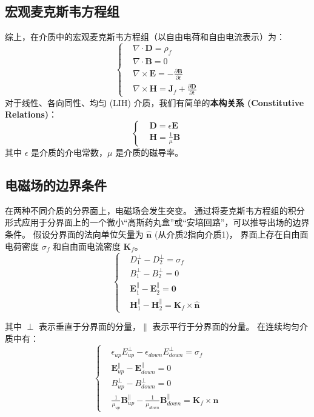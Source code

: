 \documentclass[fontset=none]{ctexart}
\begin{document}
\subsection{宏观麦克斯韦方程组}
综上，在介质中的宏观麦克斯韦方程组（以自由电荷和自由电流表示）为：
\begin{equation}
    \left\{
    \begin{aligned}
    &\nabla \cdot \bm{D} = \rho_f \\
    &\nabla \cdot \bm{B} = 0 \\
    &\nabla \times \bm{E} = -\frac{\partial\bm{B}}{\partial t}\\
    &\nabla \times \bm{H} = \bm{J}_f + \frac{\partial \bm{D}}{\partial t}
    \end{aligned}
    \right.
\end{equation}
对于线性、各向同性、均匀 (LIH) 介质，我们有简单的\textbf{本构关系 (Constitutive Relations)}：
\begin{equation}
    \left\{
    \begin{aligned}
    &\bm{D} = \epsilon \bm{E} \\
    &\bm{H} = \frac{1}{\mu} \bm{B}
    \end{aligned}
    \right.
\end{equation}
其中 $\epsilon$ 是介质的介电常数，$\mu$ 是介质的磁导率。

\subsection{电磁场的边界条件}
在两种不同介质的分界面上，电磁场会发生突变。
通过将麦克斯韦方程组的积分形式应用于分界面上的一个微小“高斯药丸盒”或“安培回路”，可以推导出场的边界条件。
假设分界面的法向单位矢量为 $\hat{\bm{n}}$ (从介质2指向介质1)，
界面上存在自由面电荷密度 $\sigma_f$ 和自由面电流密度 $\bm{K}_f$。
\begin{equation}    
    \left\{
    \begin{aligned}
    &D_1^{\perp} - D_2^{\perp} = \sigma_f \\
    &B_1^{\perp} - B_2^{\perp} = 0 \\
    &\bm{E}_1^{\parallel} - \bm{E}_2^{\parallel} = \bm{0} \\
    &\bm{H}_1^{\parallel} - \bm{H}_2^{\parallel} = \bm{K}_f \times \hat{\bm{n}}
    \end{aligned}
    \right.
\end{equation}

其中 $\perp$ 表示垂直于分界面的分量，$\parallel$ 表示平行于分界面的分量。
在连续均匀介质中有：
\begin{equation}
    \left\{
    \begin{aligned}
    &\epsilon_{up}E^{\perp}_{up} - \epsilon_{down}E^{\perp}_{down} = \sigma_f \\
    &\bm{E}^{\parallel}_{up} - \bm{E}^{\parallel}_{down} = 0 \\
    &B^{\perp}_{up} - B^{\perp}_{down} = 0 \\
    &\frac{1}{\mu_{up}}\bm{B}^{\parallel}_{up} - \frac{1}{\mu_{down}}\bm{B}^{\parallel}_{down} 
    = \bm{K}_f \times \bm{n}
    \end{aligned}
    \right.
\end{equation}
\end{document}

